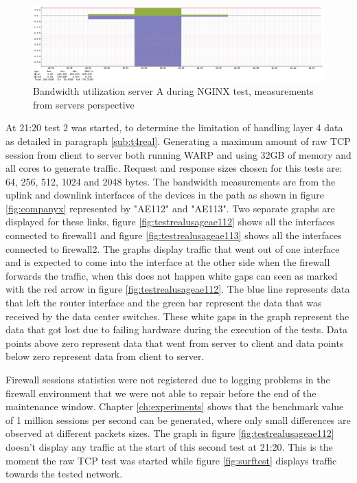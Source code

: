 \begin{figure}[H]
  \includegraphics[scale=0.35]{images/real-nginx.png}
  \caption{Bandwidth utilization server A during NGINX test, measurements from servers perspective }
  \label{fig:realnginx}
\end{figure}

At 21:20 test 2 was started, to determine the limitation of handling layer 4 data as detailed in paragraph \ref{sub:t4real}.
Generating a maximum amount of raw TCP session from client to server both running WARP and using 32GB of memory and all cores to generate traffic.
Request and response sizes chosen for this tests are: 64, 256, 512, 1024 and 2048 bytes. 
The bandwidth measurements are from the uplink and downlink interfaces of the devices in the path as shown in figure \ref{fig:companyx} represented by "AE112" and "AE113".
Two separate graphs are displayed for these links, figure \ref{fig:testrealusageae112} shows all the interfaces connected to firewall1 and figure \ref{fig:testrealusageae113} shows all the interfaces connected to firewall2.
The graphs display traffic that went out of one interface and is expected to come into the interface at the other side when the firewall forwards the traffic, when this does not happen white gaps can seen as marked with the red arrow in figure \ref{fig:testrealusageae112}. 
The blue line represents data that left the router interface and the green bar represent the data that was received by the data center switches. 
These white gaps in the graph represent the data that got lost due to failing hardware during the execution of the tests. 
Data points above zero represent data that went from server to client and data points below zero represent data from client to server.  
 
Firewall sessions statistics were not registered due to logging problems in the firewall environment that we were not able to repair before the end of the maintenance window. 
Chapter \ref{ch:experiments} shows that the benchmark value of 1 million sessions per second can be generated, where only small differences are observed at different packets sizes. 
The graph in figure \ref{fig:testrealusageae112} doesn't display any traffic at the start of this second test at 21:20. This is the moment the raw TCP test was started while figure \ref{fig:surftest} displays traffic towards the tested network. 
 
